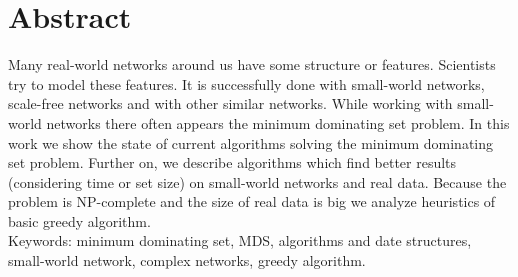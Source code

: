 \newpage

\chapter*{Abstract}
Many real-world networks around us have some structure or features. Scientists 
try to model these features. It is successfully done with small-world networks, 
scale-free networks and with other similar networks. While working with 
small-world networks there often appears the minimum dominating set problem. 
In this work we show the state of current algorithms solving the minimum 
dominating set problem. Further on, we describe algorithms which find better 
results (considering time or set size) on small-world networks and real data. 
Because the problem is NP-complete and the size of real data is big we analyze 
heuristics of basic greedy algorithm.\\
Keywords: minimum dominating set, MDS, algorithms and date structures, small-world 
network, complex networks, greedy algorithm.
\newpage

\mbox{}
\newpage

\tableofcontents
\newpage
\listoftables
\newpage
